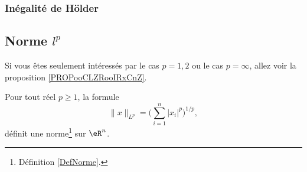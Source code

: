 \subsubsection{Inégalité de Hölder}

\subsection{Norme \( l^p\)}

Si vous êtes seulement intéressés par le cas \( p=1,2\) ou le cas \( p=\infty\), allez voir la proposition \ref{PROPooCLZRooIRxCnZ}.
\begin{proposition}     \label{PROPooUDFTooQyhAtq}
	Pour tout réel \( p\geq 1\), la formule
	\begin{equation}        \label{EqDeformeLp}
		\| x \|_{L^p}=\Big( \sum_{i=1}^n| x_i |^p\Big)^{1/p},
	\end{equation}
	définit une norme\footnote{Définition \ref{DefNorme}.} sur \( \eR^n\).
\end{proposition}

